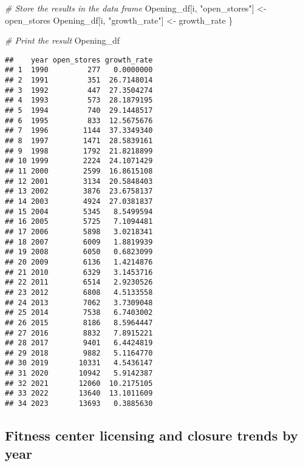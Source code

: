 \documentclass[
]{book}
\newenvironment{Shaded}{\begin{snugshade}}{\end{snugshade}}
\newcommand{\CommentTok}[1]{\textcolor[rgb]{0.56,0.35,0.01}{\textit{#1}}}
\newcommand{\NormalTok}[1]{#1}
\newcommand{\OtherTok}[1]{\textcolor[rgb]{0.56,0.35,0.01}{#1}}
\newcommand{\StringTok}[1]{\textcolor[rgb]{0.31,0.60,0.02}{#1}}
\begin{document}
\begin{Shaded}
\begin{Highlighting}[]
  \CommentTok{\# Store the results in the data frame}
\NormalTok{  Opening\_df[i, }\StringTok{"open\_stores"}\NormalTok{] }\OtherTok{\textless{}{-}}\NormalTok{ open\_stores}
\NormalTok{  Opening\_df[i, }\StringTok{"growth\_rate"}\NormalTok{] }\OtherTok{\textless{}{-}}\NormalTok{ growth\_rate}
\NormalTok{\}}

\CommentTok{\# Print the result}
\NormalTok{Opening\_df}
\end{Highlighting}
\end{Shaded}

\begin{verbatim}
##    year open_stores growth_rate
## 1  1990         277   0.0000000
## 2  1991         351  26.7148014
## 3  1992         447  27.3504274
## 4  1993         573  28.1879195
## 5  1994         740  29.1448517
## 6  1995         833  12.5675676
## 7  1996        1144  37.3349340
## 8  1997        1471  28.5839161
## 9  1998        1792  21.8218899
## 10 1999        2224  24.1071429
## 11 2000        2599  16.8615108
## 12 2001        3134  20.5848403
## 13 2002        3876  23.6758137
## 14 2003        4924  27.0381837
## 15 2004        5345   8.5499594
## 16 2005        5725   7.1094481
## 17 2006        5898   3.0218341
## 18 2007        6009   1.8819939
## 19 2008        6050   0.6823099
## 20 2009        6136   1.4214876
## 21 2010        6329   3.1453716
## 22 2011        6514   2.9230526
## 23 2012        6808   4.5133558
## 24 2013        7062   3.7309048
## 25 2014        7538   6.7403002
## 26 2015        8186   8.5964447
## 27 2016        8832   7.8915221
## 28 2017        9401   6.4424819
## 29 2018        9882   5.1164770
## 30 2019       10331   4.5436147
## 31 2020       10942   5.9142387
## 32 2021       12060  10.2175105
## 33 2022       13640  13.1011609
## 34 2023       13693   0.3885630
\end{verbatim}

\hypertarget{fitness-center-licensing-and-closure-trends-by-year}{%
\subsection{Fitness center licensing and closure trends by year}\label{fitness-center-licensing-and-closure-trends-by-year}}
\end{document}
